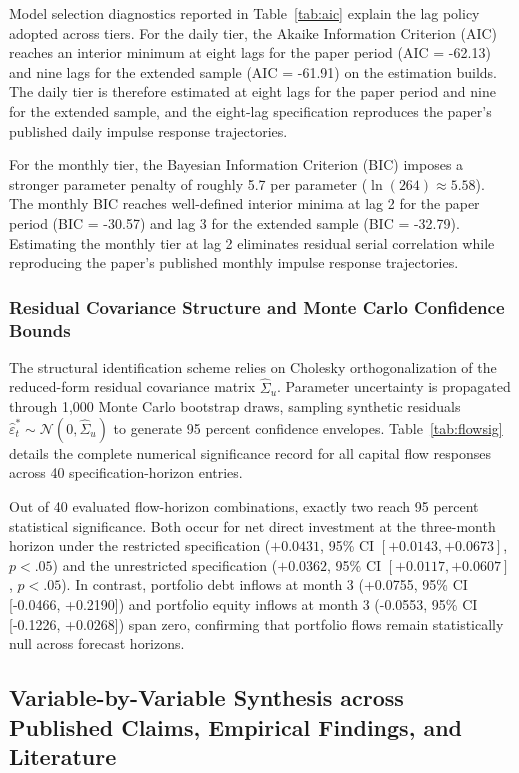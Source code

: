 Model selection diagnostics reported in Table~\ref{tab:aic} explain the lag policy adopted across tiers. For the daily tier, the Akaike Information Criterion (AIC) reaches an interior minimum at eight lags for the paper period (AIC = -62.13) and nine lags for the extended sample (AIC = -61.91) on the estimation builds. The daily tier is therefore estimated at eight lags for the paper period and nine for the extended sample, and the eight-lag specification reproduces the paper's published daily impulse response trajectories.

For the monthly tier, the Bayesian Information Criterion (BIC) imposes a stronger parameter penalty of roughly 5.7 per parameter ($\ln(264) \approx 5.58$). The monthly BIC reaches well-defined interior minima at lag 2 for the paper period (BIC = -30.57) and lag 3 for the extended sample (BIC = -32.79). Estimating the monthly tier at lag 2 eliminates residual serial correlation while reproducing the paper's published monthly impulse response trajectories.

\subsubsection{Residual Covariance Structure and Monte Carlo Confidence Bounds}

The structural identification scheme relies on Cholesky orthogonalization of the reduced-form residual covariance matrix $\hat{\Sigma}_u$. Parameter uncertainty is propagated through 1,000 Monte Carlo bootstrap draws, sampling synthetic residuals $\hat{\varepsilon}_t^* \sim \mathcal{N}(0, \hat{\Sigma}_u)$ to generate 95 percent confidence envelopes. Table~\ref{tab:flowsig} details the complete numerical significance record for all capital flow responses across 40 specification-horizon entries.

Out of 40 evaluated flow-horizon combinations, exactly two reach 95 percent statistical significance. Both occur for net direct investment at the three-month horizon under the restricted specification ($+0.0431$, 95\% CI $[+0.0143, +0.0673]$, $p < .05$) and the unrestricted specification ($+0.0362$, 95\% CI $[+0.0117, +0.0607]$, $p < .05$). In contrast, portfolio debt inflows at month 3 (+0.0755, 95\% CI [-0.0466, +0.2190]) and portfolio equity inflows at month 3 (-0.0553, 95\% CI [-0.1226, +0.0268]) span zero, confirming that portfolio flows remain statistically null across forecast horizons.

\subsection{Variable-by-Variable Synthesis across Published Claims, Empirical Findings, and Literature}

